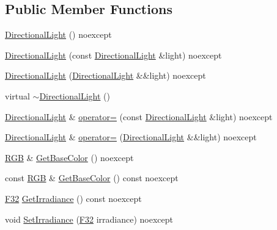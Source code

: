 \subsection*{Public Member Functions}
\begin{DoxyCompactItemize}
\item 
\hyperlink{classmage_1_1rendering_1_1_directional_light_a5a8c05a640ec86f4d1994d687de6415f}{Directional\+Light} () noexcept
\item 
\hyperlink{classmage_1_1rendering_1_1_directional_light_a95bac0f10225523a7aaf7d17503f6a5f}{Directional\+Light} (const \hyperlink{classmage_1_1rendering_1_1_directional_light}{Directional\+Light} \&light) noexcept
\item 
\hyperlink{classmage_1_1rendering_1_1_directional_light_aa8ff1e6487160eb851cc2c393be9ab6a}{Directional\+Light} (\hyperlink{classmage_1_1rendering_1_1_directional_light}{Directional\+Light} \&\&light) noexcept
\item 
virtual \hyperlink{classmage_1_1rendering_1_1_directional_light_a0f35f25f86aeb2ae688a8918fa3d8b76}{$\sim$\+Directional\+Light} ()
\item 
\hyperlink{classmage_1_1rendering_1_1_directional_light}{Directional\+Light} \& \hyperlink{classmage_1_1rendering_1_1_directional_light_aa81fa39a4d068d879a6d90587ee324d8}{operator=} (const \hyperlink{classmage_1_1rendering_1_1_directional_light}{Directional\+Light} \&light) noexcept
\item 
\hyperlink{classmage_1_1rendering_1_1_directional_light}{Directional\+Light} \& \hyperlink{classmage_1_1rendering_1_1_directional_light_abcb7fb355a9d3004fd2f9b597b6166d2}{operator=} (\hyperlink{classmage_1_1rendering_1_1_directional_light}{Directional\+Light} \&\&light) noexcept
\item 
\hyperlink{structmage_1_1_r_g_b}{R\+GB} \& \hyperlink{classmage_1_1rendering_1_1_directional_light_a492e5d6a02efa369437b606be8401985}{Get\+Base\+Color} () noexcept
\item 
const \hyperlink{structmage_1_1_r_g_b}{R\+GB} \& \hyperlink{classmage_1_1rendering_1_1_directional_light_aca3e27ba1d32b1146d3250827c1efb5f}{Get\+Base\+Color} () const noexcept
\item 
\hyperlink{namespacemage_aa97e833b45f06d60a0a9c4fc22ae02c0}{F32} \hyperlink{classmage_1_1rendering_1_1_directional_light_a1cba2b0099366af146c3ccf364946bf8}{Get\+Irradiance} () const noexcept
\item 
void \hyperlink{classmage_1_1rendering_1_1_directional_light_af8570b18bfb807492317e4a98f5c7ba6}{Set\+Irradiance} (\hyperlink{namespacemage_aa97e833b45f06d60a0a9c4fc22ae02c0}{F32} irradiance) noexcept

\end{DoxyCompactItemize}
